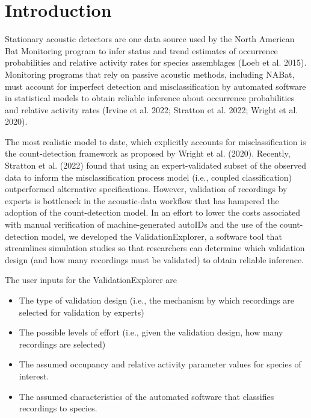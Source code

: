 \documentclass[
]{article}
\providecommand{\tightlist}{%
  \setlength{\itemsep}{0pt}\setlength{\parskip}{0pt}}
\begin{document}
\hypertarget{introduction}{%
\section{Introduction}\label{introduction}}

Stationary acoustic detectors are one data source used by the North American Bat Monitoring program to infer status and trend estimates of occurrence probabilities and relative activity rates for species assemblages (Loeb et al. 2015). Monitoring programs that rely on passive acoustic methods, including NABat, must account for imperfect detection and misclassification by automated software in statistical models to obtain reliable inference about occurrence probabilities and relative activity rates (Irvine et al. 2022; Stratton et al. 2022; Wright et al. 2020).

The most realistic model to date, which explicitly accounts for misclassification is the count-detection framework as proposed by Wright et al. (2020). Recently, Stratton et al. (2022) found that using an expert-validated subset of the observed data to inform the misclassification process model (i.e., coupled classification) outperformed alternative specifications. However, validation of recordings by experts is bottleneck in the acoustic-data workflow that has hampered the adoption of the count-detection model. In an effort to lower the costs associated with manual verification of machine-generated autoIDs and the use of the count-detection model, we developed the ValidationExplorer, a software tool that streamlines simulation studies so that researchers can determine which validation design (and how many recordings must be validated) to obtain reliable inference.

The user inputs for the ValidationExplorer are

\begin{itemize}
\tightlist
\item
  The type of validation design (i.e., the mechanism by which recordings are selected for validation by experts)
\item
  The possible levels of effort (i.e., given the validation design, how many recordings are selected)
\item
  The assumed occupancy and relative activity parameter values for species of interest.
\item
  The assumed characteristics of the automated software that classifies recordings to species.
\end{itemize}
\end{document}
